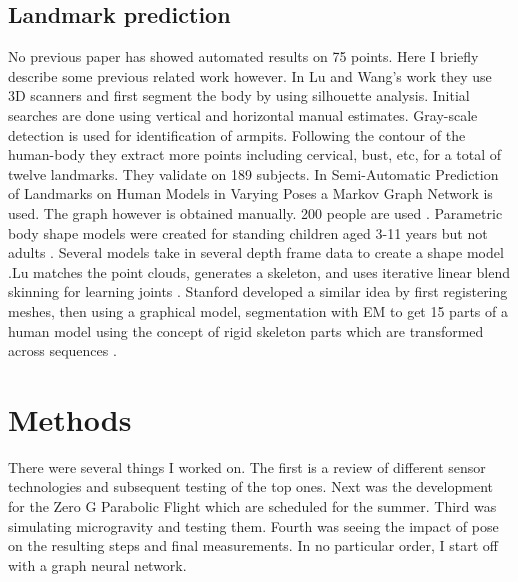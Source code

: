 \section{Landmark prediction}
No previous paper has showed automated results on 75 points. Here I briefly describe some previous related work however. In Lu and Wang's work \cite{lu2008automated} they use 3D scanners and first segment the body by using silhouette analysis. Initial searches are done using vertical and horizontal manual estimates. Gray-scale detection is used for identification of armpits. Following the contour of the human-body they extract more points including cervical, bust, etc, for a total of twelve landmarks. They validate on 189 subjects. In Semi-Automatic Prediction of Landmarks on Human Models in Varying Poses a Markov Graph Network is used. The graph however is obtained manually. 200 people are used \cite{wuhrer2010semi}. Parametric body shape models were created for standing children aged 3-11 years but not adults \cite{park2015parametric}. Several models take in several depth frame data to create a shape model \cite{deng2019neural}.Lu matches the point clouds, generates a skeleton, and uses iterative linear blend skinning for learning joints \cite{lu20193D}. Stanford developed a similar idea by first registering meshes, then using a graphical model, segmentation with EM to get 15 parts of a human model using the concept of rigid skeleton parts which are transformed across sequences \cite{anguelov2012recovering}.


\chapter{Methods}
There were several things I worked on. The first is a review of different sensor technologies and subsequent testing of the top ones. Next was the development for the Zero G Parabolic Flight which are scheduled for the summer. Third was simulating microgravity and testing them. Fourth was seeing the impact of pose on the resulting steps and final measurements. In no particular order, I start off with a graph neural network.

